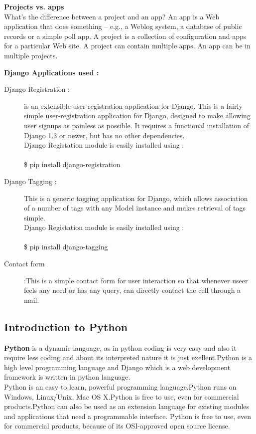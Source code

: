 {\bf Projects vs. apps}\\

What's the difference between a project and an app? An app is a Web application that does something -- e.g., a Weblog system, a database of public records or a simple poll app. A project is a collection of configuration and apps for a particular Web site. A project can contain multiple apps. An app can be in multiple projects.

\newpage
{\bf Django Applications used :}\\


\begin{description}
\item[Django Registration :] is an extensible user-registration application for Django. This is a fairly simple user-registration application for Django, designed to make allowing user signups as painless as possible. It requires a functional installation of Django 1.3 or newer, but has no other dependencies.\\
Django Registation module is easily installed using :\\ \\
\$ pip install django-registration\\
 
\item[Django Tagging :]This is a generic tagging application for Django, which allows association of a number of tags with any Model instance and makes retrieval of tags simple.\\
Django Registation module is easily installed using :\\ \\
\$ pip install django-tagging\\
\item[Contact form]:This is a simple contact form for user interaction so that whenever useer feels any need or has any query, can directly contact the cell through a mail.
\end{description}
\newpage

\subsection{Introduction to Python}
{\bf Python} is a dynamic language, as in python coding is very easy and also it require less coding and about its interpreted nature it is just exellent.Python is a high level programming language and Django which is a web development framework is written in python language.\\
Python is an easy to learn, powerful programming language.Python runs on Windows, Linux/Unix, Mac OS X.Python is free to use, even for commercial products.Python can also be used as an extension language for existing modules and applications that need a programmable interface. Python is free to use, even for commercial products, because of its OSI-approved open source license.\\

